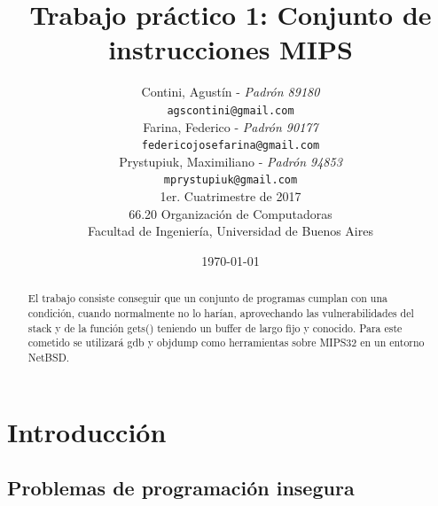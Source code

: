\documentclass[a4paper,10pt]{article}
\title{ \textbf{Trabajo práctico 1: Conjunto de instrucciones MIPS} }
\author{Contini, Agustín - \textit{Padrón 89180}			\\
            \texttt{ agscontini@gmail.com }				\\
            Farina, Federico - \textit{Padrón 90177}			\\
            \texttt{ federicojosefarina@gmail.com }				\\
            Prystupiuk, Maximiliano  - \textit{Padrón 94853  }			\\
            \texttt{ mprystupiuk@gmail.com  }					\\[2.5ex]
            1er. Cuatrimestre de 2017					\\[1.0ex]
            \normalsize{66.20 Organización de Computadoras}		\\
            \normalsize{Facultad de Ingeniería, Universidad de Buenos Aires}	\\
	}
\date{\today}
\begin{document}

\maketitle
\bigskip
\thispagestyle{empty}	%

\begin{abstract}
El trabajo consiste conseguir que un conjunto de programas
cumplan con una condición, cuando normalmente no lo harían, aprovechando las vulnerabilidades del stack y de la función gets() teniendo un buffer de largo fijo y conocido.
Para este cometido se utilizará gdb y objdump como herramientas sobre MIPS32 en un entorno NetBSD.

\end{abstract}







\pagestyle{fancy}





\normalsize

\newpage
\tableofcontents	%

\vspace{2.0cm}
\listoffigures		%

\newpage
\section{Introducci\'on}

\subsection{Problemas de programación insegura}
\end{document}
